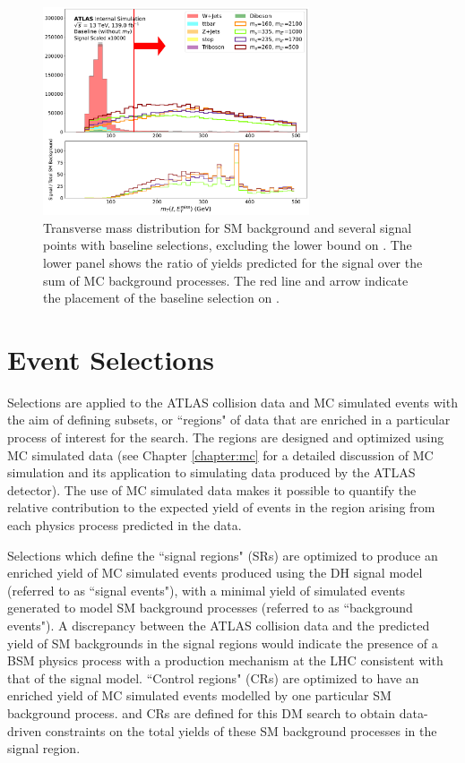 \begin{figure}[H]
	\centering
	\includegraphics[width=0.7\textwidth]{Figures/5/mT_lep_met_N_1.pdf}
	\caption[]{Transverse mass distribution for SM background and several signal points with baseline selections, excluding the lower bound on \mtlepmet. The lower panel shows the ratio of yields predicted for the signal over the sum of MC background processes. The red line and arrow indicate the placement of the baseline selection on \mtlepmet.}
	\label{fig:mT_lep_met}
\end{figure}

\section{Event Selections}
\label{sec:evt_selections}

Selections are applied to the ATLAS collision data and MC simulated events with the aim of defining subsets, or ``regions" of data that are enriched in a particular process of interest for the search. The regions are designed and optimized using MC simulated data (see Chapter \ref{chapter:mc} for a detailed discussion of MC simulation and its application to simulating data produced by the ATLAS detector). The use of MC simulated data makes it possible to quantify the relative contribution to the expected yield of events in the region arising from each physics process predicted in the data.

Selections which define the ``signal regions" (SRs) are optimized to produce an enriched yield of MC simulated events produced using the DH signal model (referred to as ``signal events"), with a minimal yield of simulated events generated to model SM background processes (referred to as ``background events"). A discrepancy between the ATLAS collision data and the predicted yield of SM backgrounds in the signal regions would indicate the presence of a BSM physics process with a production mechanism at the LHC consistent with that of the signal model. ``Control regions" (CRs) are optimized to have an enriched yield of MC simulated events modelled by one particular SM background process. \wjets and \ttbar CRs are defined for this DM search to obtain data-driven constraints on the total yields of these SM background processes in the signal region. 

